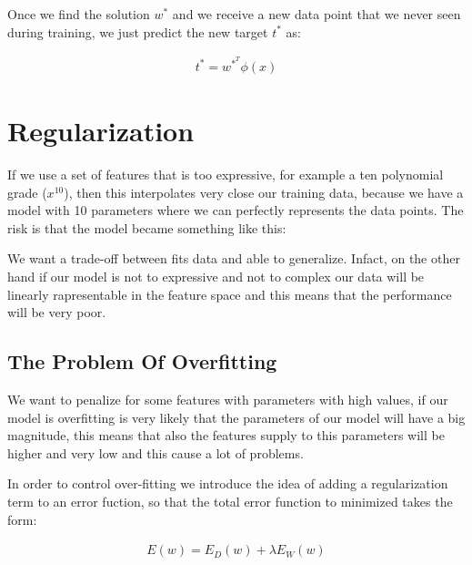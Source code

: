 \noindent Once we find the solution $w^*$ and we receive a new data point that we never seen during training, we just predict the new target $t^*$ as:

\begin{Equation}[H]
	\centering
	\begin{equation}
	\begin{aligned}
	t^* = w^{*^T} \phi(x)
	\end{aligned}
	\end{equation}
	\label{eq:mathmodelaada}
\end{Equation}

\section{Regularization}
\label{subsec:poverfitting}
If we use a set of features that is too expressive, for example a ten polynomial grade ($x^{10}$), then this interpolates very close our training data, because we have a model with 10 parameters where we can perfectly represents the data points. The risk is that the model became something like this:

\noindent[picture]

\noindent We want a trade-off between fits data and able to generalize. Infact, on the other hand if our model is not to expressive and not to complex our data will be linearly rapresentable in the feature space and this means that the performance will be very poor. 

\subsection{The Problem Of Overfitting}
We want to penalize for some features with parameters with high values, if our model is overfitting is very likely that the parameters of our model will have a big magnitude, this means that also the features supply to this parameters will be higher and very low and this cause a lot of problems.

\noindent In order to control over-fitting we introduce the idea of adding a regularization term to an error fuction, so that the total error function to minimized takes the form:

\begin{Equation}[H]
	\centering
		\begin{equation}
			\begin{aligned}
				E(w) = E_D(w) + \lambda E_W(w)
			\end{aligned}
		\end{equation}
	\label{eq:mathmodelaada}
\end{Equation}

